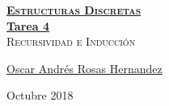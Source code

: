 \documentclass[12pt, fleqn]{article}                            %
\author{Oscar Andrés Rosas}                                     %
\theoremstyle{break}                                            %
\begin{document}
\begin{titlepage}
    
    \pagecolor{TitlePageColor}                                      %
    \color{white}                                                   %

    \vspace                                                         %
    \baselineskip                                                   %

    \makebox[0pt][l]{\rule{1.3\textwidth}{3pt}}                     %
    
    \href{https://compilandoconocimiento.com}                       %
    {\textbf{\textsc{\Huge Estructuras Discretas}}}\\[2.7cm]      %

    \href{\ProjectNameLink}                                         %
    {\fontsize{45}{52}\selectfont \textbf{Tarea 4}}\\[0.5cm]        %
    \textcolor{ColorSubtext}{\textsc{\Huge Recursividad e Inducción}}   %
    
    \vfill                                                          %
    
    \href{\ProjectAuthorLink}                                       %
    {\LARGE \textsf{Oscar Andrés Rosas Hernandez}}                  %

    \vspace                                                         %
    \baselineskip                                                   %
    
    {\large \textsf{Octubre 2018}}                                  %

\end{titlepage}
\end{document}
